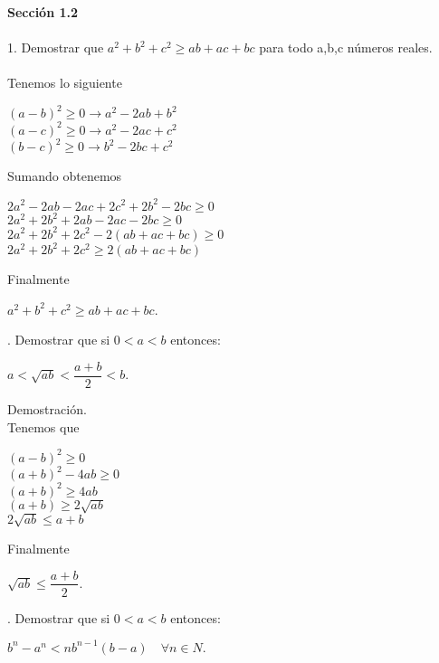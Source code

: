 \documentclass[12pt,a4paper,scrartcl]{article}
\begin{document}
{\newpage
\textbf{Secci\'on 1.2}\\
\\1. Demostrar que $a^2+b^2+c^2\geq ab+ac+bc$ para todo a,b,c n\'umeros reales.\\
\\Tenemos lo siguiente\\
\begin{center}
$ (a-b)^2 \geq 0 \rightarrow a^2-2ab+b^2$\\
$ (a-c)^2 \geq 0 \rightarrow a^2-2ac+c^2$\\
$ (b-c)^2 \geq 0 \rightarrow b^2-2bc+c^2$\\
\end{center}
Sumando obtenemos\\
\begin{center}
$2a^2-2ab-2ac+2c^2+2b^2-2bc \geq 0$\\
$2a^2+2b^2+2ab-2ac-2bc \geq 0 $\\
$2a^2+2b^2+2c^2-2(ab+ac+bc) \geq 0 $\\
$2a^2+2b^2+2c^2 \geq 2(ab+ac+bc)$\\
\end{center}
Finalmente\\
\begin{center}
$ a^2+b^2+c^2 \geq ab+ac+bc$.
\end{center}




. Demostrar que si $0 < a < b$ entonces:\\
\begin{center}
$a < \sqrt{ab} < \dfrac{a+b}{2} < b.$
\end{center}
Demostraci\'on.\\
Tenemos que\\
\begin{center}
$(a-b)^2 \geq 0$\\
$(a+b)^2 - 4 ab \geq 0$\\
$(a+b)^2 \geq 4ab$\\
$(a+b)\geq2\sqrt{ab}$\\
$2\sqrt{ab}\leq a+b$\\
\end{center}
Finalmente 
\begin{center}
$\sqrt{ab}\leq \dfrac{a+b}{2}$.
\end{center}



. Demostrar que si $0 < a < b$ entonces:\\
\begin{center}
$b^n-a^n < nb^{n-1}(b-a)\hspace{1em} \forall n \in N. $\\
\end{center}  



}
\end{document}
